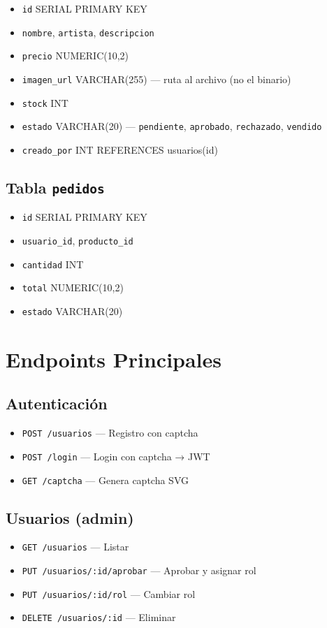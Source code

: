 \documentclass[11pt,letterpaper]{article}
\begin{document}
\begin{itemize}
  \item \texttt{id} SERIAL PRIMARY KEY
  \item \texttt{nombre}, \texttt{artista}, \texttt{descripcion}
  \item \texttt{precio} NUMERIC(10,2)
  \item \texttt{imagen\_url} VARCHAR(255) — ruta al archivo (no el binario)
  \item \texttt{stock} INT
  \item \texttt{estado} VARCHAR(20) — \texttt{pendiente}, \texttt{aprobado}, \texttt{rechazado}, \texttt{vendido}
  \item \texttt{creado\_por} INT REFERENCES usuarios(id)
\end{itemize}

\subsection{Tabla \texttt{pedidos}}

\begin{itemize}
  \item \texttt{id} SERIAL PRIMARY KEY
  \item \texttt{usuario\_id}, \texttt{producto\_id}
  \item \texttt{cantidad} INT
  \item \texttt{total} NUMERIC(10,2)
  \item \texttt{estado} VARCHAR(20)
\end{itemize}

\section{Endpoints Principales}

\subsection{Autenticación}
\begin{itemize}
  \item \texttt{POST /usuarios} — Registro con captcha
  \item \texttt{POST /login} — Login con captcha → JWT
  \item \texttt{GET /captcha} — Genera captcha SVG
\end{itemize}

\subsection{Usuarios (admin)}
\begin{itemize}
  \item \texttt{GET /usuarios} — Listar
  \item \texttt{PUT /usuarios/:id/aprobar} — Aprobar y asignar rol
  \item \texttt{PUT /usuarios/:id/rol} — Cambiar rol
  \item \texttt{DELETE /usuarios/:id} — Eliminar
\end{itemize}
\end{document}
